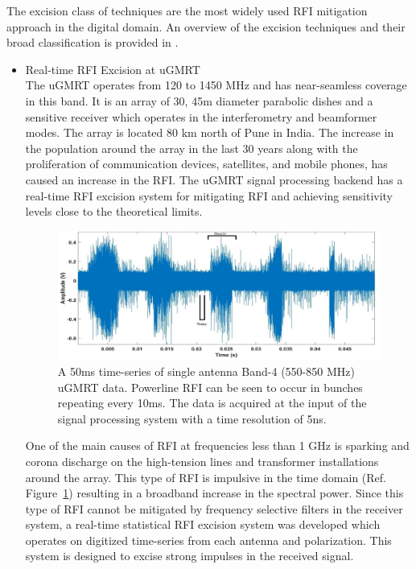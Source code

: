 The excision class of techniques are the most widely used RFI mitigation approach in the digital domain. An overview of the excision techniques and their broad classification is provided in \citep{buch2019rfic}.

\begin{itemize}
\item Real-time RFI Excision at uGMRT\\

The uGMRT operates from 120 to 1450 MHz and has near-seamless coverage in this band. It is an array of 30, 45m diameter parabolic dishes and a sensitive receiver which operates in the interferometry and beamformer modes. The array is located 80 km north of Pune in India. The increase in the population around the array in the last 30 years along with the proliferation of communication devices, satellites, and mobile phones, has caused an increase in the RFI. The uGMRT signal processing backend has a real-time RFI excision system for mitigating RFI and achieving sensitivity levels close to the theoretical limits.

\begin{figure}
    \centering
    \includegraphics[scale=0.7]{Hardware Excision Techniques/figures/Band4_timeseries_ed.jpg}
    \caption{A 50ms time-series of single antenna Band-4 (550-850 MHz) uGMRT data. Powerline RFI can be seen to occur in bunches repeating every 10ms. The data is acquired at the input of the signal processing system with a time resolution of 5ns.}
    \label{fig:ugmrt-b4-ts}
\end{figure}

One of the main causes of RFI at frequencies less than 1 GHz is sparking and corona discharge on the high-tension lines and transformer installations around the array. This type of RFI is impulsive in the time domain (Ref. Figure~\ref{fig:ugmrt-b4-ts}) resulting in a broadband increase in the spectral power. Since this type of RFI cannot be mitigated by frequency selective filters in the receiver system, a real-time statistical RFI excision system was developed which operates on digitized time-series from each antenna and polarization. This system is designed to excise strong impulses in the received signal.


\end{itemize}
